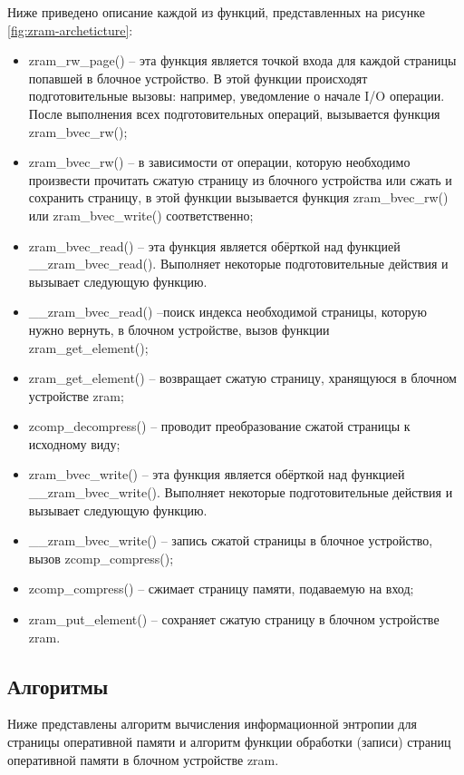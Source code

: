 Ниже приведено описание каждой из функций, представленных на рисунке \ref{fig:zram-archeticture}:

\begin{itemize}
	\item zram\_rw\_page() -- эта функция является точкой входа для каждой страницы попавшей в блочное устройство. В этой функции происходят подготовительные вызовы: например, уведомление о начале I/O операции. После выполнения всех подготовительных операций, вызывается функция zram\_bvec\_rw();
	\item zram\_bvec\_rw() -- в зависимости от операции, которую необходимо произвести прочитать сжатую страницу из блочного устройства или сжать и сохранить страницу, в этой функции вызывается функция zram\_bvec\_rw() или zram\_bvec\_write() соответственно;
	\item zram\_bvec\_read() -- эта функция является обёрткой над функцией \\\_\_zram\_bvec\_read(). Выполняет некоторые подготовительные действия и вызывает следующую функцию.
	\item \_\_zram\_bvec\_read() --поиск индекса необходимой страницы, которую нужно вернуть, в блочном устройстве, вызов функции \\zram\_get\_element();
	\item zram\_get\_element() -- возвращает сжатую страницу, хранящуюся в блочном устройстве zram;
	\item zcomp\_decompress() -- проводит преобразование сжатой страницы к исходному виду;
	\item zram\_bvec\_write() -- эта функция является обёрткой над функцией \\\_\_zram\_bvec\_write(). Выполняет некоторые подготовительные действия и вызывает следующую функцию.
	\item \_\_zram\_bvec\_write() -- запись сжатой страницы в блочное устройство, вызов zcomp\_compress();
	\item zcomp\_compress() -- сжимает страницу памяти, подаваемую на вход;
	\item zram\_put\_element() -- сохраняет сжатую страницу в блочном устройстве zram.
\end{itemize}

\subsection{Алгоритмы}

Ниже представлены алгоритм вычисления информационной энтропии для страницы оперативной памяти и алгоритм функции обработки (записи) страниц оперативной памяти в блочном устройстве zram.

